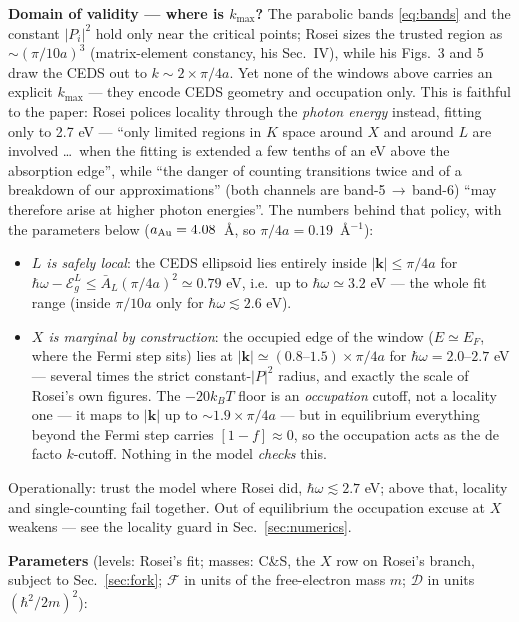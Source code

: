 \documentclass[11pt,a4paper]{article}
\numberwithin{equation}{section}
\begin{document}
\medskip
\noindent\textbf{Domain of validity --- where is $k_{\max}$?}
The parabolic bands \eqref{eq:bands} and the constant $|P_i|^2$ hold
only near the critical points; Rosei sizes the trusted region as
${\sim}(\pi/10a)^3$ (matrix-element constancy, his Sec.~IV), while his
Figs.~3 and 5 draw the CEDS out to $k\sim2\times\pi/4a$.  Yet none of
the windows above carries an explicit $k_{\max}$ --- they encode CEDS
geometry and occupation only.  This is faithful to the paper: Rosei
polices locality through the \emph{photon energy} instead, fitting
only to 2.7 eV --- ``only limited regions in $K$ space around $X$ and
around $L$ are involved \dots\ when the fitting is extended a few
tenths of an eV above the absorption edge'', while ``the danger of
counting transitions twice and of a breakdown of our approximations''
(both channels are band-5\,$\to$\,band-6) ``may therefore arise at
higher photon energies''.  The numbers behind that policy, with the
parameters below ($a_{\rm Au}=4.08$~\AA, so
$\pi/4a=0.19$~\AA$^{-1}$):
\begin{itemize}
\item \emph{$L$ is safely local}: the CEDS ellipsoid lies entirely inside $|\mathbf k|\le\pi/4a$ for ${\hbar\omega}-{\mathcal{E}_g^{L}}\le{\bar{A}}_L(\pi/4a)^2\simeq0.79$ eV, i.e.\ up to ${\hbar\omega}\simeq3.2$ eV --- the whole fit range (inside $\pi/10a$ only for ${\hbar\omega}\lesssim2.6$ eV).
\item \emph{$X$ is marginal by construction}: the occupied edge of the window ($E\simeq E_F$, where the Fermi step sits) lies at $|\mathbf k|\simeq(0.8\text{--}1.5)\times\pi/4a$ for ${\hbar\omega}=2.0$--$2.7$ eV --- several times the strict constant-$|P|^2$ radius, and exactly the scale of Rosei's own figures.  The $-20{k_B} T$ floor is an \emph{occupation} cutoff, not a locality one --- it maps to $|\mathbf k|$ up to ${\sim}1.9\times\pi/4a$ --- but in equilibrium everything beyond the Fermi step carries $[1-{f}]\approx0$, so the occupation acts as the de facto $k$-cutoff.  Nothing in the model \emph{checks} this.
\end{itemize}
Operationally: trust the model where Rosei did, ${\hbar\omega}\lesssim2.7$ eV;
above that, locality and single-counting fail together.  Out of
equilibrium the occupation excuse at $X$ weakens --- see the locality
guard in Sec.~\ref{sec:numerics}.

\medskip
\noindent\textbf{Parameters} (levels: Rosei's fit; masses: C\&S, the
$X$ row on Rosei's branch, subject to Sec.~\ref{sec:fork}; ${\mathcal{F}}$ in
units of the free-electron mass $m$; ${\mathcal{D}}$ in units $(\hbar^2/2m)^2$):
\end{document}
